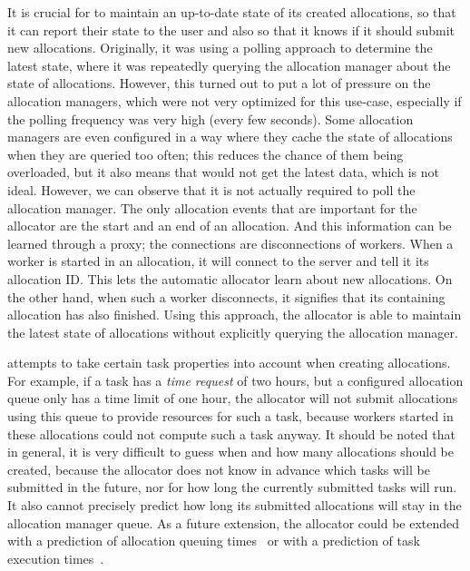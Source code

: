 It is crucial for \autoalloc{} to maintain an up-to-date state of its created
allocations, so that it can report their state to the user and also so that it knows if it should
submit new allocations. Originally, it was using a polling approach to determine the latest state,
where it was repeatedly querying the allocation manager about the state of allocations. However,
this turned out to put a lot of pressure on the allocation managers, which were not very optimized
for this use-case, especially if the polling frequency was very high (every few seconds). Some
allocation managers are even configured in a way where they cache the state of allocations when
they are queried too often; this reduces the chance of them being overloaded, but it also means
that \hyperqueue{} would not get the latest data, which is not ideal. However, we can
observe that it is not actually required to poll the allocation manager. The only allocation events
that are important for the allocator are the start and an end of an allocation. And this
information can be learned through a proxy; the connections are disconnections of
\hq{} workers. When a worker is started in an allocation, it will connect to the
server and tell it its allocation ID\@. This lets the automatic allocator learn about new
allocations. On the other hand, when such a worker disconnects, it signifies that its containing
allocation has also finished. Using this approach, the allocator is able to maintain the latest
state of allocations without explicitly querying the allocation manager.

\Autoalloc{} attempts to take certain task properties into account when creating
allocations. For example, if a task has a \emph{time request} of two hours, but a configured
allocation queue only has a time limit of one hour, the allocator will not submit allocations using
this queue to provide resources for such a task, because workers started in these allocations could
not compute such a task anyway. It should be noted that in general, it is very difficult to guess
when and how many allocations should be created, because the allocator does not know in advance
which tasks will be submitted in the future, nor for how long the currently submitted tasks will
run. It also cannot precisely predict how long its submitted allocations will stay in the
allocation manager queue. As a future extension, the allocator could be extended with a prediction
of allocation queuing times~\cite{allocation-duration-prediction} or with a prediction of task execution
times~\cite{task-duration-prediction}.

